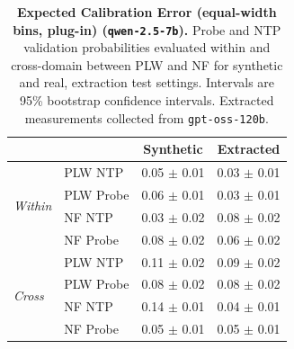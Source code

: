 \begin{table}[ht]
\centering
\begin{tabular}{ll cc}
\toprule
& & Synthetic & Extracted \\
\midrule
\multirow{4}{*}{\textit{Within}}
& PLW NTP & 0.05 $\pm$ 0.01 & 0.03 $\pm$ 0.01 \\
& PLW Probe & 0.06 $\pm$ 0.01 & 0.03 $\pm$ 0.01 \\
& NF NTP & 0.03 $\pm$ 0.02 & 0.08 $\pm$ 0.02 \\
& NF Probe & 0.08 $\pm$ 0.02 & 0.06 $\pm$ 0.02 \\
\midrule
\multirow{4}{*}{\textit{Cross}}
& PLW NTP & 0.11 $\pm$ 0.02 & 0.09 $\pm$ 0.02 \\
& PLW Probe & 0.08 $\pm$ 0.02 & 0.08 $\pm$ 0.02 \\
& NF NTP & 0.14 $\pm$ 0.01 & 0.04 $\pm$ 0.01 \\
& NF Probe & 0.05 $\pm$ 0.01 & 0.05 $\pm$ 0.01 \\
\bottomrule
\end{tabular}
\caption{\textbf{Expected Calibration Error (equal-width bins, plug-in) (\texttt{qwen-2.5-7b}).} Probe and NTP validation probabilities evaluated within and cross-domain between PLW and NF for synthetic and real, extraction test settings. Intervals are 95\% bootstrap confidence intervals. Extracted measurements collected from \texttt{gpt-oss-120b}.}
\label{tab:qwen-2.5-7b-gpt-oss-120b-pond_nfix-ece}
\end{table}
